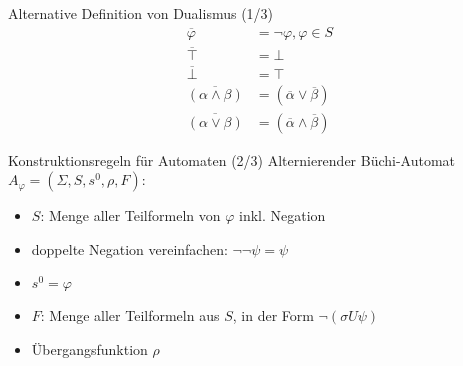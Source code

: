 \begin{frame}{\insertsubsection}
\begin{block}{Alternative Definition von Dualismus (1/3)}
    \vspace*{-1em}
    \begin{equation*}
    \label{aba-zu-ltl:dualismus}
    \begin{split}
        \overline{\varphi} &= \lnot\varphi, \varphi \in S\\
        \overline{\top} &= \bot\\
        \overline{\bot} &= \top\\
        \overline{(\alpha \land \beta)} &= (\overline{\alpha} \lor \overline{\beta})\\
        \overline{(\alpha \lor \beta)} &= (\overline{\alpha} \land \overline{\beta})
    \end{split}
    \end{equation*}
\end{block}
\end{frame}

\begin{frame}{\insertsubsection}
\begin{block}{Konstruktionsregeln für Automaten (2/3)}
Alternierender Büchi-Automat $A_\varphi = (\Sigma, S, s^0, \rho, F)$:
\vspace*{1em}
    \begin{itemize}[<+->]
        \setlength\itemsep{1em}
        \item $S$: Menge aller Teilformeln von $\varphi$ inkl. Negation
        \item doppelte Negation vereinfachen: $\lnot\lnot\psi = \psi$
        \item $s^0 = \varphi$
        \item $F$: Menge aller Teilformeln aus $S$, in der Form $\lnot(\sigma U\psi)$
        \item Übergangsfunktion $\rho$
    \end{itemize}
\end{block}
\end{frame}

